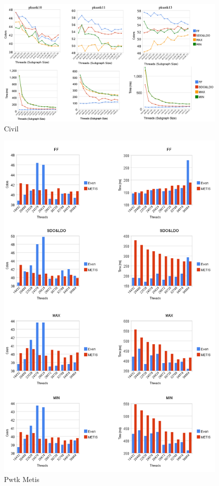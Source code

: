 \documentclass[preprint]{sigplanconf}
\begin{document}
\begin{figure}[h]
  \includegraphics[scale=0.34]{figures/civilLand.png}
  \caption{ Civil }
\end{figure}

\begin{figure}[h]
  \includegraphics[scale=0.45]{figures/pwtkMetis.png}
  \caption{ Pwtk Metis }
\end{figure}
\end{document}
